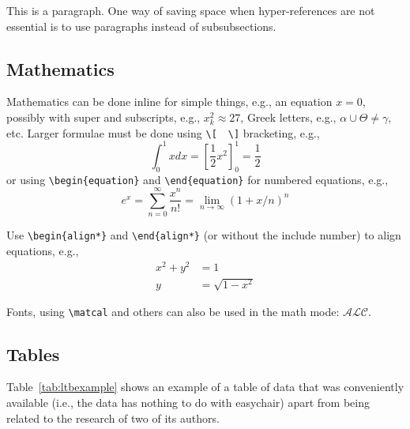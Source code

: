 \documentclass{easychair}
\newcommand{\easychair}{\textsf{easychair}}
\begin{document}
This is a paragraph. 
One way of saving space when hyper-references are not essential is to 
use paragraphs instead of subsubsections.

\subsection{Mathematics}
\label{sect:mathematics}

Mathematics can be done inline for simple things, e.g., an equation
$x = 0$, possibly with super and subscripts, e.g., $x^2_k \approx 27$,
Greek letters, e.g., $\alpha \cup \Theta \ne \gamma$, etc.
Larger formulae must be done using {\tt \verb|\|[}~~{\tt \verb|\|]}
bracketing, e.g.,
\[
\int_{0}^{1} x dx = \left[ \frac{1}{2}x^2 \right]_{0}^{1} = \frac{1}{2}
\]
or using {\tt \verb|\|begin\{equation\}} and {\tt \verb|\|end\{equation\}} for
numbered equations, e.g.,
\begin{equation}
e^x = \sum_{n=0}^\infty \frac{x^n}{n!} = \lim_{n\rightarrow\infty} (1+x/n)^n
\end{equation}

Use {\tt \verb|\|begin\{align*\}} and {\tt \verb|\|end\{align*\}} (or without
the {\tt *} include number) to align equations, e.g.,
\begin{align*}
x^2 + y^2 &= 1 \\
y &= \sqrt{1 - x^2}
\end{align*}

Fonts, using \verb|\matcal| and others can also be used in the math mode: $\mathcal{ALC}$.

\subsection{Tables}
\label{sect:tables}

Table~\ref{tab:ltbexample} shows an example of a table of data that was
conveniently available (i.e., the data has nothing to do with
{\easychair}) apart from being related to the research of two of its
authors. 
\end{document}
